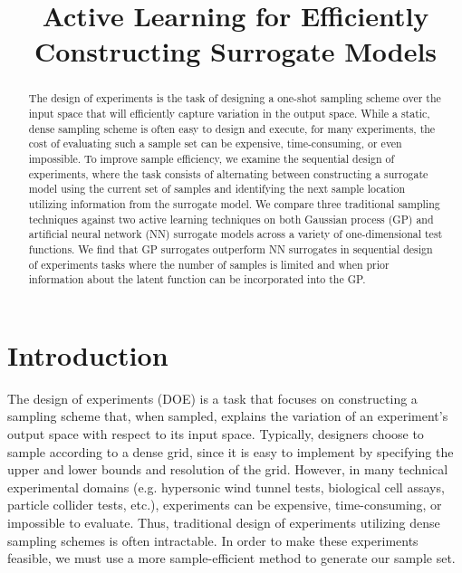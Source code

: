 \documentclass[conference,final]{IEEEtran}
\begin{document}
	
	
	\title{\LARGE \textbf{Active Learning for Efficiently Constructing Surrogate Models}}
	
	
	\author{
		} %
	
	
	\maketitle
	
	\begin{abstract}
		The design of experiments is the task of designing a one-shot sampling scheme over the input space that will efficiently capture variation in the output space. While a static, dense sampling scheme is often easy to design and execute, for many experiments, the cost of evaluating such a sample set can be expensive, time-consuming, or even impossible. To improve sample efficiency, we examine the sequential design of experiments, where the task consists of alternating between constructing a surrogate model using the current set of samples and identifying the next sample location utilizing information from the surrogate model. We compare three traditional sampling techniques against two active learning techniques on both Gaussian process (GP) and artificial neural network (NN) surrogate models across a variety of one-dimensional test functions. We find that GP surrogates outperform NN surrogates in sequential design of experiments tasks where the number of samples is limited and when prior information about the latent function can be incorporated into the GP.
	\end{abstract}
	
	\section{Introduction}
	\label{sec:introduction}
	
	The design of experiments (DOE) is a task that focuses on constructing a sampling scheme that, when sampled, explains the variation of an experiment's output space with respect to its input space. Typically, designers choose to sample according to a dense grid, since it is easy to implement by specifying the upper and lower bounds and resolution of the grid. However, in many technical experimental domains (e.g. hypersonic wind tunnel tests, biological cell assays, particle collider tests, etc.), experiments can be expensive, time-consuming, or impossible to evaluate. Thus, traditional design of experiments utilizing dense sampling schemes is often intractable. In order to make these experiments feasible, we must use a more sample-efficient method to generate our sample set. 
	
\end{document}
